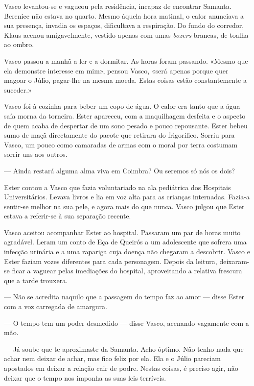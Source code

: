 Vasco levantou-se e vagueou pela residência, incapaz de encontrar
Samanta. Berenice não estava no quarto. Mesmo àquela hora matinal, o
calor anunciava a sua presença, invadia os espaços, dificultava a
respiração. Do fundo do corredor, Klaus acenou amigavelmente, vestido
apenas com umas \emph{boxers }brancas, de toalha ao ombro.

Vasco passou a manhã a ler e a dormitar. As horas foram passando. «Mesmo
que ela demonstre interesse em mim», pensou Vasco, «será apenas porque
quer magoar o Júlio, pagar-lhe na mesma moeda. Estas coisas estão
constantemente a suceder.»

Vasco foi à cozinha para beber um copo de água. O calor era tanto que a
água saía morna da torneira. Ester apareceu, com a maquilhagem desfeita
e o aspecto de quem acaba de despertar de um sono pesado e pouco
repousante. Ester bebeu sumo de maçã directamente do pacote que retirara
do frigorífico. Sorriu para Vasco, um pouco como camaradas de armas com o moral
por terra costumam sorrir uns aos outros.

--- Ainda restará alguma alma viva em Coimbra? Ou seremos só nós os
  dois?


Ester contou a Vasco que fazia voluntariado na ala pediátrica dos
Hospitais Universitários. Levava livros e lia em voz alta para as
crianças internadas. Fazia-a sentir-se melhor na sua pele, e agora mais
do que nunca. Vasco julgou que Ester estava a referir-se à sua separação
recente.

Vasco aceitou acompanhar Ester ao hospital. Passaram um par de horas
muito agradável. Leram um conto de Eça de Queirós a um adolescente que
sofrera uma infecção urinária e a uma rapariga cuja doença não chegaram
a descobrir. Vasco e Ester faziam vozes diferentes para cada personagem.
Depois da leitura, deixaram-se ficar a vaguear pelas imediações do
hospital, aproveitando a relativa frescura que a tarde trouxera.

--- Não se acredita naquilo que a passagem do tempo faz ao amor --- disse
  Ester com a voz carregada de amargura.

--- O tempo tem um poder desmedido --- disse Vasco, acenando vagamente com
  a mão.

--- Já soube que te aproximaste da Samanta. Acho óptimo. Não tenho nada
  que achar nem deixar de achar, mas fico feliz por ela. Ela e o Júlio
  pareciam apostados em deixar a relação cair de podre. Nestas coisas, é
  preciso agir, não deixar que o tempo nos imponha as suas leis
  terríveis.


